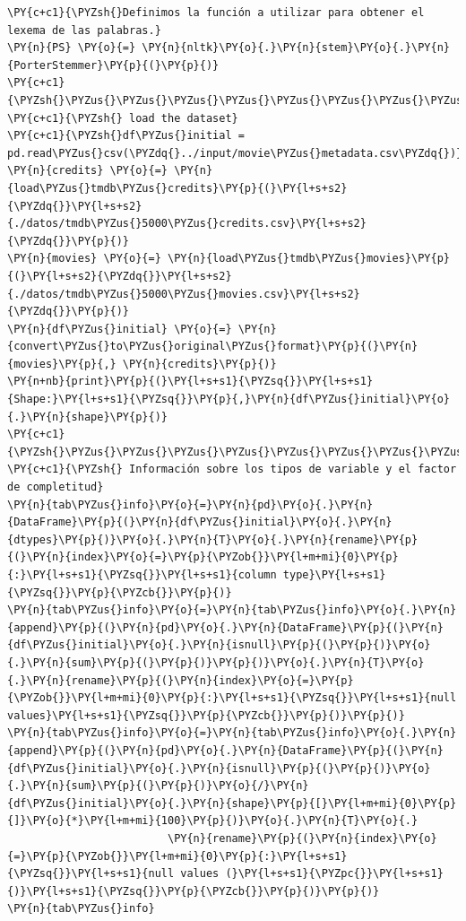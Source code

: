 \begin{tcolorbox}[breakable, size=fbox, boxrule=1pt, pad at break*=1mm,colback=cellbackground, colframe=cellborder]
\begin{Verbatim}[commandchars=\\\{\}]
\PY{c+c1}{\PYZsh{}Definimos la función a utilizar para obtener el lexema de las palabras.}
\PY{n}{PS} \PY{o}{=} \PY{n}{nltk}\PY{o}{.}\PY{n}{stem}\PY{o}{.}\PY{n}{PorterStemmer}\PY{p}{(}\PY{p}{)}
\PY{c+c1}{\PYZsh{}\PYZus{}\PYZus{}\PYZus{}\PYZus{}\PYZus{}\PYZus{}\PYZus{}\PYZus{}\PYZus{}\PYZus{}\PYZus{}\PYZus{}\PYZus{}\PYZus{}\PYZus{}\PYZus{}\PYZus{}\PYZus{}}
\PY{c+c1}{\PYZsh{} load the dataset}
\PY{c+c1}{\PYZsh{}df\PYZus{}initial = pd.read\PYZus{}csv(\PYZdq{}../input/movie\PYZus{}metadata.csv\PYZdq{})}
\PY{n}{credits} \PY{o}{=} \PY{n}{load\PYZus{}tmdb\PYZus{}credits}\PY{p}{(}\PY{l+s+s2}{\PYZdq{}}\PY{l+s+s2}{./datos/tmdb\PYZus{}5000\PYZus{}credits.csv}\PY{l+s+s2}{\PYZdq{}}\PY{p}{)}
\PY{n}{movies} \PY{o}{=} \PY{n}{load\PYZus{}tmdb\PYZus{}movies}\PY{p}{(}\PY{l+s+s2}{\PYZdq{}}\PY{l+s+s2}{./datos/tmdb\PYZus{}5000\PYZus{}movies.csv}\PY{l+s+s2}{\PYZdq{}}\PY{p}{)}
\PY{n}{df\PYZus{}initial} \PY{o}{=} \PY{n}{convert\PYZus{}to\PYZus{}original\PYZus{}format}\PY{p}{(}\PY{n}{movies}\PY{p}{,} \PY{n}{credits}\PY{p}{)}
\PY{n+nb}{print}\PY{p}{(}\PY{l+s+s1}{\PYZsq{}}\PY{l+s+s1}{Shape:}\PY{l+s+s1}{\PYZsq{}}\PY{p}{,}\PY{n}{df\PYZus{}initial}\PY{o}{.}\PY{n}{shape}\PY{p}{)}
\PY{c+c1}{\PYZsh{}\PYZus{}\PYZus{}\PYZus{}\PYZus{}\PYZus{}\PYZus{}\PYZus{}\PYZus{}\PYZus{}\PYZus{}\PYZus{}\PYZus{}\PYZus{}\PYZus{}\PYZus{}\PYZus{}\PYZus{}\PYZus{}\PYZus{}\PYZus{}\PYZus{}\PYZus{}\PYZus{}\PYZus{}\PYZus{}\PYZus{}\PYZus{}\PYZus{}\PYZus{}\PYZus{}\PYZus{}\PYZus{}\PYZus{}\PYZus{}\PYZus{}\PYZus{}\PYZus{}\PYZus{}\PYZus{}\PYZus{}\PYZus{}\PYZus{}}
\PY{c+c1}{\PYZsh{} Información sobre los tipos de variable y el factor de completitud}
\PY{n}{tab\PYZus{}info}\PY{o}{=}\PY{n}{pd}\PY{o}{.}\PY{n}{DataFrame}\PY{p}{(}\PY{n}{df\PYZus{}initial}\PY{o}{.}\PY{n}{dtypes}\PY{p}{)}\PY{o}{.}\PY{n}{T}\PY{o}{.}\PY{n}{rename}\PY{p}{(}\PY{n}{index}\PY{o}{=}\PY{p}{\PYZob{}}\PY{l+m+mi}{0}\PY{p}{:}\PY{l+s+s1}{\PYZsq{}}\PY{l+s+s1}{column type}\PY{l+s+s1}{\PYZsq{}}\PY{p}{\PYZcb{}}\PY{p}{)}
\PY{n}{tab\PYZus{}info}\PY{o}{=}\PY{n}{tab\PYZus{}info}\PY{o}{.}\PY{n}{append}\PY{p}{(}\PY{n}{pd}\PY{o}{.}\PY{n}{DataFrame}\PY{p}{(}\PY{n}{df\PYZus{}initial}\PY{o}{.}\PY{n}{isnull}\PY{p}{(}\PY{p}{)}\PY{o}{.}\PY{n}{sum}\PY{p}{(}\PY{p}{)}\PY{p}{)}\PY{o}{.}\PY{n}{T}\PY{o}{.}\PY{n}{rename}\PY{p}{(}\PY{n}{index}\PY{o}{=}\PY{p}{\PYZob{}}\PY{l+m+mi}{0}\PY{p}{:}\PY{l+s+s1}{\PYZsq{}}\PY{l+s+s1}{null values}\PY{l+s+s1}{\PYZsq{}}\PY{p}{\PYZcb{}}\PY{p}{)}\PY{p}{)}
\PY{n}{tab\PYZus{}info}\PY{o}{=}\PY{n}{tab\PYZus{}info}\PY{o}{.}\PY{n}{append}\PY{p}{(}\PY{n}{pd}\PY{o}{.}\PY{n}{DataFrame}\PY{p}{(}\PY{n}{df\PYZus{}initial}\PY{o}{.}\PY{n}{isnull}\PY{p}{(}\PY{p}{)}\PY{o}{.}\PY{n}{sum}\PY{p}{(}\PY{p}{)}\PY{o}{/}\PY{n}{df\PYZus{}initial}\PY{o}{.}\PY{n}{shape}\PY{p}{[}\PY{l+m+mi}{0}\PY{p}{]}\PY{o}{*}\PY{l+m+mi}{100}\PY{p}{)}\PY{o}{.}\PY{n}{T}\PY{o}{.}
                         \PY{n}{rename}\PY{p}{(}\PY{n}{index}\PY{o}{=}\PY{p}{\PYZob{}}\PY{l+m+mi}{0}\PY{p}{:}\PY{l+s+s1}{\PYZsq{}}\PY{l+s+s1}{null values (}\PY{l+s+s1}{\PYZpc{}}\PY{l+s+s1}{)}\PY{l+s+s1}{\PYZsq{}}\PY{p}{\PYZcb{}}\PY{p}{)}\PY{p}{)}
\PY{n}{tab\PYZus{}info}
\end{Verbatim}
\end{tcolorbox}

